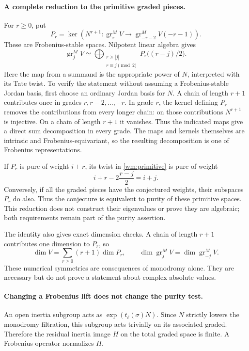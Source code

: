 \documentclass[11pt]{article}
\begin{document}
\paragraph{A complete reduction to the primitive graded pieces.}
For $r\ge0$, put
\[
 P_r=\ker\left(N^{r+1}:\operatorname{gr}^M_rV
                \longrightarrow\operatorname{gr}^M_{-r-2}V(-r-1)\right).
\]
These are Frobenius-stable spaces. Nilpotent linear algebra gives
\begin{equation}\label{wm:primitive}
 \operatorname{gr}^M_j V\simeq
 \bigoplus_{\substack{r\ge |j|\\r\equiv j\pmod2}}
 P_r\bigl((r-j)/2\bigr).
\end{equation}
Here the map from a summand is the appropriate power of $N$, interpreted
with its Tate twist. To verify the statement without assuming a
Frobenius-stable Jordan basis, first choose an ordinary Jordan basis for
$N$. A chain of length $r+1$ contributes once in grades
$r,r-2,\ldots,-r$. In grade $r$, the kernel defining $P_r$ removes
the contributions from every longer chain: on those contributions
$N^{r+1}$ is injective. On a chain of length $r+1$ it vanishes.
Thus the indicated maps give a direct sum decomposition in every grade.
The maps and kernels themselves are intrinsic and Frobenius-equivariant,
so the resulting decomposition is one of Frobenius representations.

If $P_r$ is pure of weight $i+r$, its twist in
\eqref{wm:primitive} is pure of weight
\[
 i+r-2\frac{r-j}{2}=i+j.
\]
Conversely, if all the graded pieces have the conjectured weights,
their subspaces $P_r$ do also. Thus the conjecture is equivalent to
purity of these primitive spaces. This reduction does not construct
their eigenvalues or prove they are algebraic; both requirements remain
part of the purity assertion.

The identity also gives exact dimension checks. A chain of length
$r+1$ contributes one dimension to $P_r$, so
\[
 \dim V=\sum_{r\ge0}(r+1)\dim P_r,\qquad
 \dim\operatorname{gr}_j^M V=\dim\operatorname{gr}_{-j}^M V.
\]
These numerical symmetries are consequences of monodromy alone. They
are necessary but do not prove a statement about complex absolute values.

\paragraph{Changing a Frobenius lift does not change the purity test.}
An open inertia subgroup acts as $\exp(t_\ell(\sigma)N)$.
Since $N$ strictly lowers the monodromy filtration, this subgroup acts
trivially on its associated graded. Therefore the residual inertia
image $H$ on the total graded space is finite. A Frobenius operator
normalizes $H$.
\end{document}
